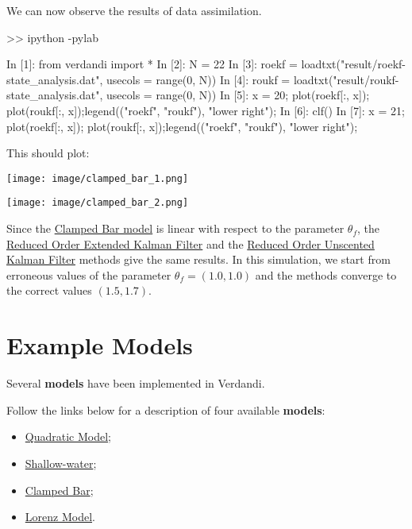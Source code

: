\documentclass{tufte-book}
\begin{document}
\-We can now observe the results of data assimilation.

\begin{frame_python}
>> ipython -pylab

In  [1]: from verdandi import *
In  [2]: N = 22
In  [3]: roekf = loadtxt("result/roekf-state_analysis.dat", usecols = range(0, N))
In  [4]: roukf = loadtxt("result/roukf-state_analysis.dat", usecols = range(0, N))
In  [5]: x = 20; plot(roekf[:, x]); plot(roukf[:, x]);legend(("roekf", "roukf"), "lower right");
In  [6]: clf()
In  [7]: x = 21; plot(roekf[:, x]); plot(roukf[:, x]);legend(("roekf", "roukf"), "lower right");
\end{frame_python}


\-This should plot\-:

\texttt{[image: image/clamped\_bar\_1.png]}

\texttt{[image: image/clamped\_bar\_2.png]}


\-Since the \hyperlink{clamped_bar}{\-Clamped \-Bar model} is linear with respect to the parameter $ \theta_f $, the \hyperlink{reduced_order_extended_kalman_filter}{\-Reduced \-Order \-Extended \-Kalman \-Filter} and the \hyperlink{reduced_order_unscented_kalman_filter}{\-Reduced \-Order \-Unscented \-Kalman \-Filter} methods give the same results. \-In this simulation, we start from erroneous values of the parameter $ \theta_f = (1.0, 1.0)$ and the methods converge to the correct values $ (1.5, 1.7)$.






\hypertarget{models}{}\section{Example Models}\label{models}

\-Several {\bfseries models} have been implemented in \-Verdandi.

\-Follow the links below for a description of four available {\bfseries models}\-:


\begin{itemize}
\item \hyperlink{quadratic_model}{\-Quadratic \-Model};
\item \hyperlink{shallow_water}{\-Shallow-\/water};
\item \hyperlink{clamped_bar}{\-Clamped \-Bar};
\item \hyperlink{lorenz}{\-Lorenz \-Model}.
\end{itemize}
\end{document}
